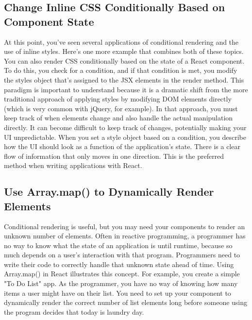 \documentclass{article}%
\begin{document}
%
\subsection{Change Inline CSS Conditionally Based on Component State}%
\label{subsec:ChangeInlineCSSConditionallyBasedonComponentState}%
At this point, you've seen several applications of conditional rendering and the use of inline styles. Here's one more example that combines both of these topics. You can also render CSS conditionally based on the state of a React component. To do this, you check for a condition, and if that condition is met, you modify the styles object that's assigned to the JSX elements in the render method.\newline%
This paradigm is important to understand because it is a dramatic shift from the more traditional approach of applying styles by modifying DOM elements directly (which is very common with jQuery, for example). In that approach, you must keep track of when elements change and also handle the actual manipulation directly. It can become difficult to keep track of changes, potentially making your UI unpredictable. When you set a style object based on a condition, you describe how the UI should look as a function of the application's state. There is a clear flow of information that only moves in one direction. This is the preferred method when writing applications with React.\newline%

%
\subsection{Use Array.map() to Dynamically Render Elements}%
\label{subsec:UseArray.map()toDynamicallyRenderElements}%
Conditional rendering is useful, but you may need your components to render an unknown number of elements. Often in reactive programming, a programmer has no way to know what the state of an application is until runtime, because so much depends on a user's interaction with that program. Programmers need to write their code to correctly handle that unknown state ahead of time. Using Array.map() in React illustrates this concept.\newline%
For example, you create a simple "To Do List" app. As the programmer, you have no way of knowing how many items a user might have on their list. You need to set up your component to dynamically render the correct number of list elements long before someone using the program decides that today is laundry day.\newline%
\end{document}
